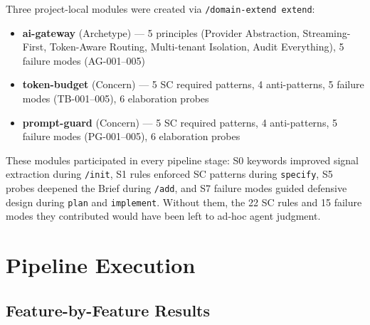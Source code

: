 \documentclass[11pt,a4paper,openright,twoside]{report}
\newcommand{\cmd}[1]{\texttt{/#1}}
\begin{document}
Three project-local modules were created via \cmd{domain-extend extend}:

\begin{itemize}[nosep]
  \item \textbf{ai-gateway} (Archetype) --- 5 principles (Provider Abstraction, Streaming-First, Token-Aware Routing, Multi-tenant Isolation, Audit Everything), 5 failure modes (AG-001--005)
  \item \textbf{token-budget} (Concern) --- 5 SC required patterns, 4 anti-patterns, 5 failure modes (TB-001--005), 6 elaboration probes
  \item \textbf{prompt-guard} (Concern) --- 5 SC required patterns, 4 anti-patterns, 5 failure modes (PG-001--005), 6 elaboration probes
\end{itemize}

\begin{notebox}
These modules participated in every pipeline stage: S0 keywords improved signal extraction during \cmd{init}, S1 rules enforced SC patterns during \texttt{specify}, S5 probes deepened the Brief during \cmd{add}, and S7 failure modes guided defensive design during \texttt{plan} and \texttt{implement}. Without them, the 22 SC rules and 15 failure modes they contributed would have been left to ad-hoc agent judgment.
\end{notebox}

\section{Pipeline Execution}

\subsection{Feature-by-Feature Results}
\end{document}
